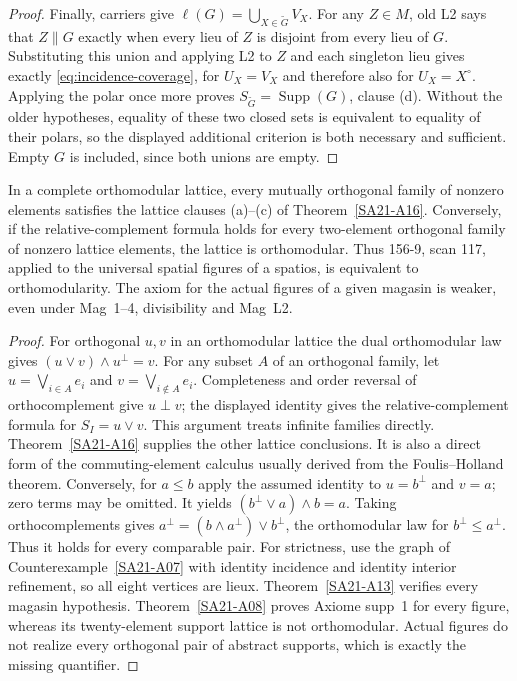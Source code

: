 \begin{proof}
Finally, carriers give
$\ell(G)=\bigcup_{X\in\widetilde G}V_X$. For any $Z\in M$,
old L2 says that $Z\parallel G$ exactly when every lieu of $Z$
is disjoint from every lieu of $G$. Substituting this union and
applying L2 to $Z$ and each singleton lieu gives exactly
\eqref{eq:incidence-coverage}, for $U_X=V_X$ and therefore also
for $U_X=X^\circ$. Applying the polar once more proves
$S_{\widetilde G}=\operatorname{Supp}(G)$, clause (d).
Without the older hypotheses, equality of these two closed sets
is equivalent to equality of their polars, so the displayed
additional criterion is both necessary and sufficient. Empty $G$
is included, since both unions are empty.
\end{proof}

\begin{theorem}
\label{SA21-A17}
In a complete orthomodular lattice, every mutually orthogonal family
of nonzero elements satisfies the lattice clauses (a)--(c) of
Theorem~\ref{SA21-A16}. Conversely, if the relative-complement formula
holds for every two-element orthogonal family of nonzero lattice
elements, the lattice is orthomodular. Thus 156-9, scan 117, applied
to the universal spatial figures of a spatios, is equivalent to
orthomodularity. The axiom for the actual figures of a given magasin
is weaker, even under Mag~1--4, divisibility and Mag~L2.
\end{theorem}
\begin{proof}
For orthogonal $u,v$ in an orthomodular lattice the dual
orthomodular law gives
$(u\vee v)\wedge u^\perp=v$. For any subset $A$ of an orthogonal
family, let $u=\bigvee_{i\in A}e_i$ and
$v=\bigvee_{i\notin A}e_i$. Completeness and order reversal of
orthocomplement give $u\perp v$; the displayed identity gives the
relative-complement formula for $S_I=u\vee v$. This argument treats
infinite families directly. Theorem~\ref{SA21-A16} supplies the other
lattice conclusions. It is also a direct form of the commuting-element
calculus usually derived from the Foulis--Holland theorem.
Conversely, for $a\leq b$ apply the assumed identity to
$u=b^\perp$ and $v=a$; zero terms may be omitted. It yields
$(b^\perp\vee a)\wedge b=a$. Taking orthocomplements gives
$a^\perp=(b\wedge a^\perp)\vee b^\perp$, the orthomodular law
for $b^\perp\leq a^\perp$. Thus it holds for every comparable pair.
For strictness, use the graph of Counterexample~\ref{SA21-A07} with
identity incidence and identity interior refinement, so all eight
vertices are lieux. Theorem~\ref{SA21-A13} verifies every magasin
hypothesis. Theorem~\ref{SA21-A08} proves Axiome supp~1 for every
figure, whereas its twenty-element support lattice is not
orthomodular. Actual figures do not realize every orthogonal pair of
abstract supports, which is exactly the missing quantifier.
\end{proof}

